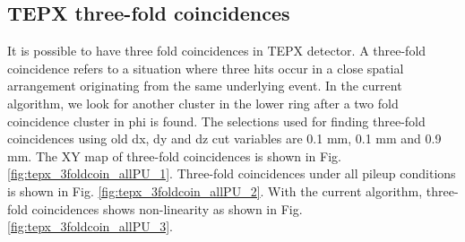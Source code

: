 \subsection{TEPX three-fold coincidences}

It is possible to have three fold coincidences in TEPX detector. A three-fold coincidence refers to a situation where three hits occur in a close spatial arrangement originating from the same underlying event. In the current algorithm, we look for another cluster in the lower ring after a two fold coincidence cluster in phi is found. The selections used for finding three-fold coincidences using old dx, dy and dz cut variables are 0.1 mm, 0.1 mm and 0.9 mm. The XY map of three-fold coincidences is shown in Fig. \ref{fig:tepx_3foldcoin_allPU_1}. Three-fold coincidences under all pileup conditions is shown in Fig.  \ref{fig:tepx_3foldcoin_allPU_2}.  With the current algorithm, three-fold coincidences shows non-linearity as shown in Fig. \ref{fig:tepx_3foldcoin_allPU_3}. %

